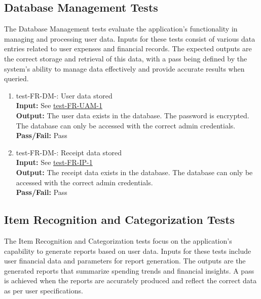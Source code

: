 \documentclass[12pt, titlepage]{article}
\begin{document}
\subsection{Database Management Tests}
The Database Management tests evaluate the application's functionality in managing and processing
user data. Inputs for these tests consist of various data entries related to user expenses 
and financial records. The expected outputs are the correct storage and retrieval of this 
data, with a pass being defined by the system's ability to manage data effectively and 
provide accurate results when queried.

\begin{enumerate}
  \item test-FR-DM-: User data stored\\
    \textbf{Input:} See \hyperref[test-FR-UAM-1]{test-FR-UAM-1}\\
    \textbf{Output:} The user data exists in the database. The password is
    encrypted. The database can only be accessed with the correct admin
    credentials.\\
    \textbf{Pass/Fail:} Pass\\
  \item test-FR-DM-: Receipt data stored\\
    \textbf{Input:} See \hyperref[test-FR-IP-1]{test-FR-IP-1}\\
    \textbf{Output:} The receipt data exists in the database. The database can
    only be accessed with the correct admin credentials.\\
    \textbf{Pass/Fail:} Pass\\
\end{enumerate}

\subsection{Item Recognition and Categorization Tests}
The Item Recognition and Categorization tests focus on the application's capability to generate reports based 
on user data. Inputs for these tests include user financial data and parameters for report 
generation. The outputs are the generated reports that summarize spending trends and 
financial insights. A pass is achieved when the reports are accurately produced and reflect 
the correct data as per user specifications.
\end{document}
